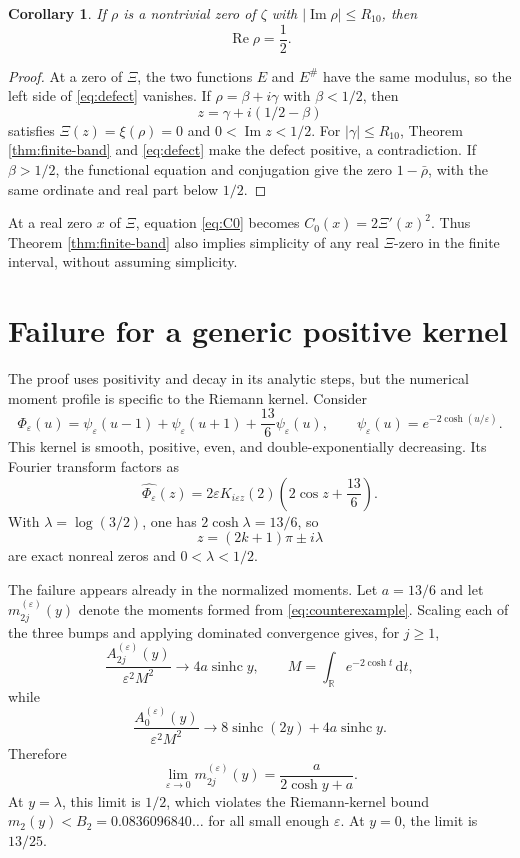 \documentclass[11pt]{amsart}
\newtheorem{corollary}[theorem]{Corollary}
\theoremstyle{remark}
\newcommand{\sinhc}{\operatorname{sinhc}}
\newcommand{\R}{\mathbb{R}}
\newcommand{\dd}{\,\mathrm{d}}
\begin{document}
\begin{corollary}\label{cor:zeros}
If $\rho$ is a nontrivial zero of $\zeta$ with
$|\operatorname{Im}\rho|\leq R_{10}$, then
\[
\operatorname{Re}\rho=\frac12.
\]
\end{corollary}

\begin{proof}
At a zero of $\Xi$, the two functions $E$ and $E^{\#}$ have the same
modulus, so the left side of \eqref{eq:defect} vanishes.  If
$\rho=\beta+i\gamma$ with $\beta<1/2$, then
\[
z=\gamma+i(1/2-\beta)
\]
satisfies $\Xi(z)=\xi(\rho)=0$ and $0<\operatorname{Im}z<1/2$.  For
$|\gamma|\leq R_{10}$, Theorem \ref{thm:finite-band} and \eqref{eq:defect}
make the defect positive, a contradiction.  If $\beta>1/2$, the functional
equation and conjugation give the zero $1-\bar\rho$, with the same ordinate
and real part below $1/2$.
\end{proof}

At a real zero $x$ of $\Xi$, equation \eqref{eq:C0} becomes
$C_0(x)=2\Xi'(x)^2$.  Thus Theorem \ref{thm:finite-band} also implies simplicity
of any real $\Xi$-zero in the finite interval, without assuming simplicity.

\section{Failure for a generic positive kernel}

The proof uses positivity and decay in its analytic steps, but the numerical
moment profile is specific to the Riemann kernel.  Consider
\begin{equation}\label{eq:counterexample}
\Phi_\varepsilon(u)=
\psi_\varepsilon(u-1)+\psi_\varepsilon(u+1)
+\frac{13}{6}\psi_\varepsilon(u),
\qquad
\psi_\varepsilon(u)=e^{-2\cosh(u/\varepsilon)}.
\end{equation}
This kernel is smooth, positive, even, and double-exponentially decreasing.
Its Fourier transform factors as
\begin{equation}\label{eq:counterexample-FT}
\widehat{\Phi_\varepsilon}(z)=
2\varepsilon K_{i\varepsilon z}(2)
\left(2\cos z+\frac{13}{6}\right).
\end{equation}
With $\lambda=\log(3/2)$, one has $2\cosh\lambda=13/6$, so
\[
z=(2k+1)\pi\pm i\lambda
\]
are exact nonreal zeros and $0<\lambda<1/2$.

The failure appears already in the normalized moments.  Let
$a=13/6$ and let $m_{2j}^{(\varepsilon)}(y)$ denote the moments formed from
\eqref{eq:counterexample}.  Scaling each of the three bumps and applying
dominated convergence gives, for $j\geq1$,
\[
\frac{A_{2j}^{(\varepsilon)}(y)}{\varepsilon^2M^2}
\longrightarrow 4a\sinhc y,
\qquad
M=\int_{\R}e^{-2\cosh t}\dd t,
\]
while
\[
\frac{A_0^{(\varepsilon)}(y)}{\varepsilon^2M^2}
\longrightarrow 8\sinhc(2y)+4a\sinhc y.
\]
Therefore
\begin{equation}\label{eq:counterexample-moments}
\lim_{\varepsilon\to0}m_{2j}^{(\varepsilon)}(y)
=\frac{a}{2\cosh y+a}.
\end{equation}
At $y=\lambda$, this limit is $1/2$, which violates the Riemann-kernel
bound $m_2(y)<B_2=0.0836096840\ldots$ for all small enough $\varepsilon$.
At $y=0$, the limit is $13/25$.
\end{document}
